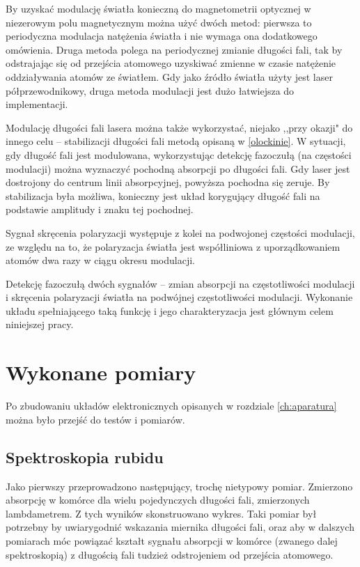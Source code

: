 \documentclass[a4paper,10pt,twoside]{article}
\begin{document}
By uzyskać modulację światła konieczną do magnetometrii optycznej w niezerowym polu magnetycznym można użyć dwóch metod: pierwsza to periodyczna modulacja natężenia światła i nie wymaga ona dodatkowego omówienia. Druga metoda polega na periodycznej zmianie długości fali, tak by odstrajając się od przejścia atomowego uzyskiwać zmienne w czasie natężenie oddziaływania atomów ze światłem. Gdy jako źródło światła użyty jest laser półprzewodnikowy, druga metoda modulacji jest dużo łatwiejsza do implementacji.

Modulację długości fali lasera można także wykorzystać, niejako  ,,przy okazji" do innego celu -- stabilizacji długości fali metodą opisaną w \ref{olockinie}. W sytuacji, gdy długość fali jest modulowana, wykorzystując detekcję fazoczułą (na częstości modulacji) można wyznaczyć pochodną absorpcji po długości fali.
Gdy laser jest dostrojony do centrum linii absorpcyjnej, powyższa pochodna się zeruje. By stabilizacja była możliwa, konieczny jest układ korygujący długość fali na podstawie amplitudy i znaku tej pochodnej.

Sygnał skręcenia polaryzacji występuje z kolei na podwojonej częstości modulacji, ze względu na to, że polaryzacja światła jest współliniowa z uporządkowaniem atomów dwa razy w ciągu okresu modulacji.

Detekcję fazoczułą dwóch sygnałów -- zmian absorpcji na częstotliwości modulacji i skręcenia polaryzacji światła na podwójnej częstotliwości modulacji. Wykonanie układu spełniającego taką funkcję i jego charakteryzacja jest głównym celem niniejszej pracy.



\pagebreak


\section{Wykonane pomiary}

Po zbudowaniu układów elektronicznych opisanych w rozdziale \ref{ch:aparatura} można było przejść do testów i pomiarów.




\subsection{Spektroskopia rubidu}

Jako pierwszy przeprowadzono następujący, trochę nietypowy pomiar.
Zmierzono absorpcję w komórce dla wielu pojedynczych długości fali, zmierzonych lambdametrem. Z tych wyników skonstruowano wykres.
Taki pomiar był potrzebny by uwiarygodnić wskazania miernika długości fali, oraz aby w dalszych pomiarach móc powiązać kształt sygnału absorpcji w komórce (zwanego dalej spektroskopią) z długością fali tudzież odstrojeniem od przejścia atomowego.
 
\end{document}
